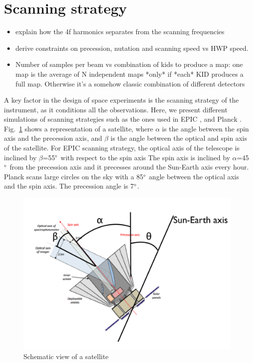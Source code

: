 
\section{Scanning strategy}

\begin{itemize}
\item explain how the 4f harmonics separates from the scanning frequencies
\item derive constraints on precession, nutation and scanning speed vs HWP
  speed.
\item Number of samples per beam vs combination of kids to produce a map: one
  map is the average of N independent maps *only* if *each* KID produces a full
  map. Otherwise it's a somehow classic combination of different detectors
\end{itemize}

A key factor in the design of space experiments is the scanning strategy of the instrument, as it conditions all the observations. Here, we present different simulations of scanning strategies such as the ones used in EPIC \citep{2009arXiv0906.1188B}, and Planck \citep{2005A&A...430..363D}. \\

Fig.~\ref{fig:satellite} shows a representation of a satellite, where $\alpha$ is the angle between the spin axis and the precession axis, and $\beta$ is the angle between the optical and spin axis of the satellite.
For EPIC scanning strategy, the optical axis of the telescope is inclined by $\beta$=55$\degree$ with respect to the spin axis The spin axis is inclined by $\alpha$=45$\degree$ from the precession axis and it precesses around the Sun-Earth axis every hour.
Planck scans large circles on the sky with a 85$\degree$ angle between the optical axis and the spin axis. The precession angle is 7$\degree$.

\begin{figure}[h]
  \includegraphics[clip,angle=0,width=\columnwidth]{Figures/schema_satellite.png}
  \caption{Schematic view of a satellite}
  \label{fig:satellite}
\end{figure}

